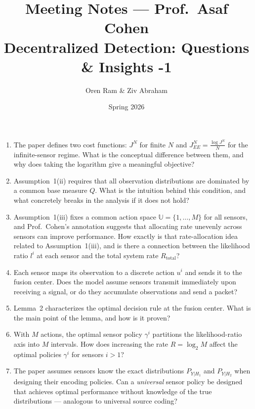 \documentclass[11pt]{article}
\title{\textbf{Meeting Notes --- Prof.\ Asaf Cohen}\\
\large Decentralized Detection: Questions \& Insights -1}
\author{Oren Ram \& Ziv Abraham}
\date{Spring 2026}
\begin{document}
\maketitle

\begin{enumerate}[leftmargin=*, itemsep=10pt]

    \item The paper defines two cost functions: $J^N$ for finite $N$ and
    $J^N_{EE} = \frac{\log J^N}{N}$ for the infinite-sensor regime.
    What is the conceptual difference between them, and why does taking
    the logarithm give a meaningful objective?

    \item Assumption~1(ii) requires that all observation distributions
    are dominated by a common base measure $Q$.
    What is the intuition behind this condition, and what concretely
    breaks in the analysis if it does not hold?

    \item Assumption~1(iii) fixes a common action space $\mathbb{U} = \{1,\ldots,M\}$
    for all sensors, and Prof.\ Cohen's annotation suggests that
    allocating rate unevenly across sensors can improve performance.
    How exactly is that rate-allocation idea related to Assumption~1(iii),
    and is there a connection between the likelihood ratio $l^i$ at each
    sensor and the total system rate $R_{\text{total}}$?

    \item Each sensor maps its observation to a discrete action $u^i$
    and sends it to the fusion center.
    Does the model assume sensors transmit immediately upon receiving
    a signal, or do they accumulate observations and send a packet?

    \item Lemma~2 characterizes the optimal decision rule at the fusion center.
    What is the main point of the lemma, and how is it proven?

    \item With $M$ actions, the optimal sensor policy $\gamma^i$ partitions
    the likelihood-ratio axis into $M$ intervals.
    How does increasing the rate $R = \log_2 M$ affect the optimal
    policies $\gamma^i$ for sensors $i > 1$?

    \item The paper assumes sensors know the exact distributions
    $P_{Y|H_1}$ and $P_{Y|H_2}$ when designing their encoding policies.
    Can a \emph{universal} sensor policy be designed that achieves optimal
    performance without knowledge of the true distributions --- analogous
    to universal source coding?


\end{enumerate}
\end{document}
